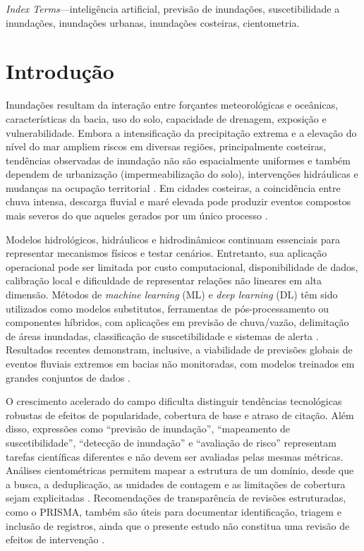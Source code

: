 \medskip
\noindent\textit{Index Terms}---inteligência artificial, previsão de inundações, suscetibilidade a inundações, inundações urbanas, inundações costeiras, cientometria.
\endgroup

\section{Introdução}
\label{sec:art-introducao}

Inundações resultam da interação entre forçantes meteorológicas e oceânicas, características da bacia, uso do solo, capacidade de drenagem, exposição e vulnerabilidade. Embora a intensificação da precipitação extrema e a elevação do nível do mar ampliem riscos em diversas regiões, principalmente costeiras, tendências observadas de inundação não são espacialmente uniformes e também dependem de urbanização (impermeabilização do solo), intervenções hidráulicas e mudanças na ocupação territorial \cite{ipcc2022,wahl2015}. Em cidades costeiras, a coincidência entre chuva intensa, descarga fluvial e maré elevada pode produzir eventos compostos mais severos do que aqueles gerados por um único processo \cite{wahl2015}.

Modelos hidrológicos, hidráulicos e hidrodinâmicos continuam essenciais para representar mecanismos físicos e testar cenários. Entretanto, sua aplicação operacional pode ser limitada por custo computacional, disponibilidade de dados, calibração local e dificuldade de representar relações não lineares em alta dimensão. Métodos de \textit{machine learning} (ML) e \textit{deep learning} (DL) têm sido utilizados como modelos substitutos, ferramentas de pós-processamento ou componentes híbridos, com aplicações em previsão de chuva/vazão, delimitação de áreas inundadas, classificação de suscetibilidade e sistemas de alerta \cite{mosavi2018,shen2018,kratzert2018,nearing2021}. Resultados recentes demonstram, inclusive, a viabilidade de previsões globais de eventos fluviais extremos em bacias não monitoradas, com modelos treinados em grandes conjuntos de dados \cite{nearing2024}.

O crescimento acelerado do campo dificulta distinguir tendências tecnológicas robustas de efeitos de popularidade, cobertura de base e atraso de citação. Além disso, expressões como ``previsão de inundação'', ``mapeamento de suscetibilidade'', ``detecção de inundação'' e ``avaliação de risco'' representam tarefas científicas diferentes e não devem ser avaliadas pelas mesmas métricas. Análises cientométricas permitem mapear a estrutura de um domínio, desde que a busca, a deduplicação, as unidades de contagem e as limitações de cobertura sejam explicitadas \cite{aria2017}. Recomendações de transparência de revisões estruturadas, como o PRISMA, também são úteis para documentar identificação, triagem e inclusão de registros, ainda que o presente estudo não constitua uma revisão de efeitos de intervenção \cite{page2021}.


